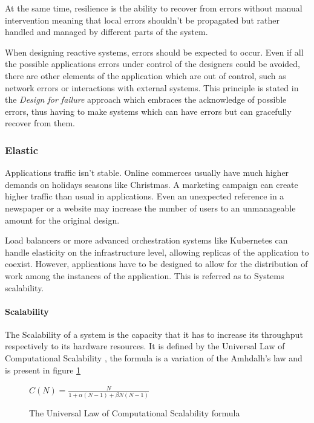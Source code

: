 \documentclass[../main.tex]{subfiles}
\begin{document}
At the same time, resilience is the ability to recover from errors without manual
intervention meaning that local errors shouldn't be propagated but rather handled and
managed by different parts of the system.

When designing reactive systems, errors should be expected to occur. Even if all
the possible applications errors under control of the designers could be avoided, there
are other elements of the application which are out of control, such as network
errors or interactions with external systems. This principle is stated in the
\textit{Design for failure} approach \autocite{Sussna2015DesigningDelivery} which embraces the
acknowledge of possible errors, thus having to make systems which can have
errors but can gracefully recover from them.

\subsubsection{Elastic}

Applications traffic isn't stable. Online commerces usually have much higher
demands on holidays seasons like Christmas. A marketing campaign can create
higher traffic than usual in applications. Even an unexpected reference in a
newspaper or a website may increase the number of users to an unmanageable
amount for the original design.

Load balancers or more advanced orchestration systems like Kubernetes
\cite{Production-GradeKubernetes} can handle elasticity on the infrastructure
level, allowing replicas of the application to coexist. However, applications
have to be designed to allow for the distribution of work among the instances of the
application. This is referred as to Systems scalability.

\paragraph{Scalability}

The Scalability of a system is the capacity that it has to increase its
throughput respectively to its hardware resources. It is defined by the
Universal Law of Computational Scalability \autocite{Gunther2008AFunctions}, the formula
is a variation of the Amhdalh's law \autocite{Rodgers1985ImprovementsDesign} and is present in figure \ref{fig:scalability}

\begin{figure}[ht] \centering
  $C(N)={\frac {N}{1+\alpha (N-1)+\beta N(N-1)}}$
  \caption{The Universal Law of Computational Scalability formula}
  \label{fig:scalability}
\end{figure}
\end{document}
